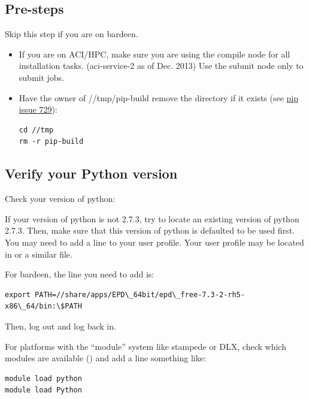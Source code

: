 \documentclass[letterpaper,10pt,english]{sphinxmanual}
\begin{document}
\subsection{Pre-steps}
\label{1_0_installation:pre-steps}
Skip this step if you are on bardeen.
\begin{itemize}
\item {} 
If you are on ACI/HPC, make sure you are using the compile node for all installation tasks. (aci-service-2 as of Dec. 2013) Use the submit node only to submit jobs.

\item {} 
Have the owner of //tmp/pip-build remove the directory if it exists (see \href{https://github.com/pypa/pip/issues/729}{pip issue 729}):

\begin{Verbatim}[commandchars=\\\{\}]
cd //tmp
rm -r pip-build
\end{Verbatim}

\end{itemize}


\subsection{Verify your Python version}
\label{1_0_installation:verify-your-python-version}
Check your version of python: 

If your version of python is not 2.7.3, try to locate an existing version of python 2.7.3.
Then, make sure that this version of python is defaulted to be used first. You may need to add a line to your user profile. Your user profile may be located in  or a similar file.

For bardeen, the line you need to add is:

\begin{Verbatim}[commandchars=\\\{\}]
export PATH=//share/apps/EPD\_64bit/epd\_free-7.3-2-rh5-x86\_64/bin:\$PATH
\end{Verbatim}

Then, log out and log back in.

For platforms with the ``module'' system like stampede or DLX, check which modules are available () and add a line something like:

\begin{Verbatim}[commandchars=\\\{\}]
module load python
module load Python
\end{Verbatim}
\end{document}
